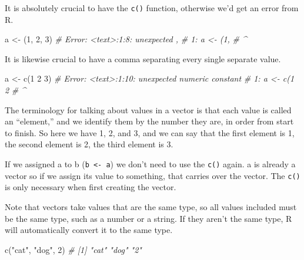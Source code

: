 \documentclass[
  a4paper,
]{krantz}
\makeatletter
\newenvironment{Shaded}{\begin{snugshade}}{\end{snugshade}}
\newcommand{\CommentTok}[1]{\textcolor[rgb]{0.37,0.37,0.37}{\textit{#1}}}
\newcommand{\DecValTok}[1]{\textcolor[rgb]{0.06,0.06,0.06}{#1}}
\newcommand{\FunctionTok}[1]{\textcolor[rgb]{0,0,0}{#1}}
\newcommand{\NormalTok}[1]{#1}
\newcommand{\OtherTok}[1]{\textcolor[rgb]{0.37,0.37,0.37}{#1}}
\newcommand{\StringTok}[1]{\textcolor[rgb]{0.5,0.5,0.5}{#1}}
\newenvironment{kframe}{%
\medskip{}
\setlength{\fboxsep}{.8em}
 \def\at@end@of@kframe{}%
 \ifinner\ifhmode%
  \def\at@end@of@kframe{\end{minipage}}%
  \begin{minipage}{\columnwidth}%
 \fi\fi%
 \def\FrameCommand##1{\hskip\@totalleftmargin \hskip-\fboxsep
 \colorbox{shadecolor}{##1}\hskip-\fboxsep
     \hskip-\linewidth \hskip-\@totalleftmargin \hskip\columnwidth}%
 \MakeFramed {\advance\hsize-\width
   \@totalleftmargin\z@ \linewidth\hsize
   \@setminipage}}%
 {\par\unskip\endMakeFramed%
 \at@end@of@kframe}
\renewenvironment{Shaded}{\begin{kframe}}{\end{kframe}}
\makeatother
\begin{document}
It is absolutely crucial to have the \texttt{c()} function,
otherwise we'd get an error from R.

\begin{Shaded}
\begin{Highlighting}[]
\NormalTok{a }\OtherTok{\textless{}{-}}\NormalTok{ (}\DecValTok{1}\NormalTok{, }\DecValTok{2}\NormalTok{, }\DecValTok{3}\NormalTok{)}
\CommentTok{\# Error: \textless{}text\textgreater{}:1:8: unexpected \textquotesingle{},\textquotesingle{}}
\CommentTok{\# 1: a \textless{}{-} (1,}
\CommentTok{\#            \^{}}
\end{Highlighting}
\end{Shaded}

It is likewise crucial to have a comma separating every
single separate value.

\begin{Shaded}
\begin{Highlighting}[]
\NormalTok{a }\OtherTok{\textless{}{-}} \FunctionTok{c}\NormalTok{(}\DecValTok{1} \DecValTok{2} \DecValTok{3}\NormalTok{)}
\CommentTok{\# Error: \textless{}text\textgreater{}:1:10: unexpected numeric constant}
\CommentTok{\# 1: a \textless{}{-} c(1 2}
\CommentTok{\#              \^{}}
\end{Highlighting}
\end{Shaded}

The terminology for talking about values in a vector is that
each value is called an ``element,'' and we identify them by
the number they are, in order from start to finish. So here
we have 1, 2, and 3, and we can say that the first element
is 1, the second element is 2, the third element is 3.

If we assigned a to b (\texttt{b\ \textless{}-\ a}) we don't
need to use the \texttt{c()} again. a is already a vector so
if we assign its value to something, that carries over the
vector. The \texttt{c()} is only necessary when first
creating the vector.

Note that vectors take values that are the same type, so all
values included must be the same type, such as a number or a
string. If they aren't the same type, R will automatically
convert it to the same type.

\begin{Shaded}
\begin{Highlighting}[]
\FunctionTok{c}\NormalTok{(}\StringTok{"cat"}\NormalTok{, }\StringTok{"dog"}\NormalTok{, }\DecValTok{2}\NormalTok{)}
\CommentTok{\# [1] "cat" "dog" "2"}
\end{Highlighting}
\end{Shaded}
\end{document}
